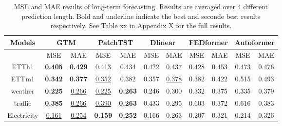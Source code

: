 \begin{table*}[]
\centering
\caption{MSE and MAE results of long-term forecasting. Results are averaged over 4 different prediction length. Bold and underline indicate the best and seconde best results respectively. See Table xx in Appendix X for the full results.}
\label{table:avg. results for long-term forecasting}
\small  %
\setlength{\tabcolsep}{4pt} %
\renewcommand{\arraystretch}{0.8} %
\begin{tabular}{c|cc|cc|cc|cc|cc}
\toprule
Models &\multicolumn{2}{c|}{GTM} &\multicolumn{2}{c|}{PatchTST} &\multicolumn{2}{c|}{Dlinear} &\multicolumn{2}{c|}{FEDformer} &\multicolumn{2}{c|}{Autoformer} \\ \midrule

   & {MSE}  & MAE  & {MSE}  & MAE      & {MSE}   & MAE   & {MSE}   & MAE      & {MSE}   & MAE    \\ \midrule
   
   ETTh1 & \textbf{0.405} & \textbf{0.429} & \underline{0.413} & \underline{0.434} & 0.422 & 0.437 & 0.428 & 0.453 & 0.473 & 0.476 \\

ETTm1 & \textbf{0.342} & \textbf{0.377} & \underline{0.352} & 0.382 & 0.357 & \underline{0.378} & 0.382 & 0.422 & 0.515 & 0.493 \\

weather & \textbf{0.225} & \underline{0.266} & \underline{0.225} & \textbf{0.263} & 0.246 & 0.300 & 0.332 & 0.375 & 0.335 & 0.379 \\

traffic & \textbf{0.385} & \underline{0.266} & \underline{0.390} & \textbf{0.263} & 0.433 & 0.295 & 0.603 & 0.372 & 0.616 & 0.383 \\

Electricity & \underline{0.161} & \underline{0.254} & \textbf{0.159} & \textbf{0.252} & 0.166 & 0.263 & 0.207 & 0.321 & 0.214 & 0.326  \\ 
            \bottomrule
\end{tabular}

\end{table*}